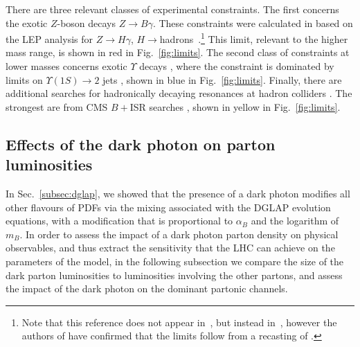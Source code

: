 \documentclass[withindex,glossary]{cam-thesis}
\begin{document}
There are three relevant classes of experimental constraints.  The first
concerns the exotic $Z$-boson decays $Z\to B\gamma$.  These constraints
were calculated in \cite{Dror:2017ehi} based on the LEP analysis for
$Z\to H\gamma$, $H\to$hadrons~\cite{L3:1996dmt}.\footnote{Note that
  this reference does not appear in~\cite{Dror:2017ehi}, but instead
  in~\cite{L3:1991kow,L3:1992kcg}, however the authors of
  \cite{Dror:2017ehi} have confirmed that the limits follow from a
  recasting of \cite{L3:1996dmt}.} This limit, relevant to the higher
mass range, is shown in red in Fig.~\ref{fig:limits}.  The second
class of constraints at lower masses concerns exotic $\Upsilon$ decays
\cite{Carone:1994aa,Aranda:1998fr}, where the constraint is dominated
by limits on $\Upsilon(1S)\to 2$ jets \cite{ARGUS:1986nzm}, shown in
blue in Fig.~\ref{fig:limits}. Finally, there are additional searches for
hadronically decaying resonances at hadron colliders
\cite{Dobrescu:2013cmh,Shimmin:2016vlc,ATLAS:2019itm,Dobrescu:2021vak}.
The strongest are from CMS $B+$ISR searches
\cite{CMS:2019xai,CMS:2019emo}, shown in yellow in
Fig.~\ref{fig:limits}. 

\subsection{Effects of the dark photon on parton luminosities}
In Sec.~\ref{subsec:dglap}, we showed that the presence of a dark photon modifies
all other flavours of PDFs via the mixing associated with the
DGLAP evolution equations, with a modification that is proportional to
$\alpha_B$ and the logarithm of $m_B$. 
In order to assess the impact of a dark photon
parton density on physical observables, and thus extract the 
sensitivity that the LHC can achieve on the
parameters of the model, in the following subsection
we compare the size of the dark parton luminosities to luminosities
involving the other partons, and assess the impact of the dark photon
on the dominant partonic channels.
\end{document}
